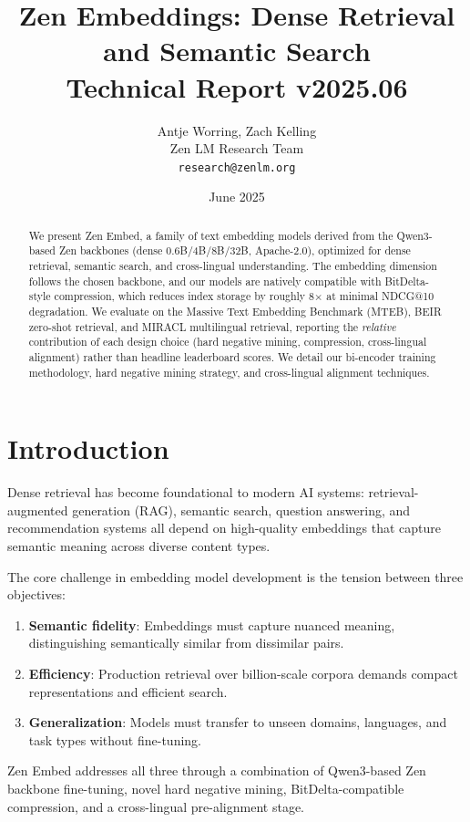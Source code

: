 \documentclass[11pt,a4paper]{article}
\title{\textbf{Zen Embeddings: Dense Retrieval and Semantic Search}\\
\large Technical Report v2025.06}
\author{Antje Worring, Zach Kelling \\ Zen LM Research Team\\
\texttt{research@zenlm.org}}
\date{June 2025}
\begin{document}
\maketitle

\begin{abstract}
We present Zen Embed, a family of text embedding models derived from the Qwen3-based Zen backbones (dense 0.6B/4B/8B/32B, Apache-2.0), optimized for dense retrieval, semantic search, and cross-lingual understanding. The embedding dimension follows the chosen backbone, and our models are natively compatible with BitDelta-style compression, which reduces index storage by roughly 8$\times$ at minimal NDCG@10 degradation. We evaluate on the Massive Text Embedding Benchmark (MTEB), BEIR zero-shot retrieval, and MIRACL multilingual retrieval, reporting the \emph{relative} contribution of each design choice (hard negative mining, compression, cross-lingual alignment) rather than headline leaderboard scores. We detail our bi-encoder training methodology, hard negative mining strategy, and cross-lingual alignment techniques.
\end{abstract}

\section{Introduction}

Dense retrieval has become foundational to modern AI systems: retrieval-augmented generation (RAG), semantic search, question answering, and recommendation systems all depend on high-quality embeddings that capture semantic meaning across diverse content types.

The core challenge in embedding model development is the tension between three objectives:
\begin{enumerate}
  \item \textbf{Semantic fidelity}: Embeddings must capture nuanced meaning, distinguishing semantically similar from dissimilar pairs.
  \item \textbf{Efficiency}: Production retrieval over billion-scale corpora demands compact representations and efficient search.
  \item \textbf{Generalization}: Models must transfer to unseen domains, languages, and task types without fine-tuning.
\end{enumerate}

Zen Embed addresses all three through a combination of Qwen3-based Zen backbone fine-tuning, novel hard negative mining, BitDelta-compatible compression, and a cross-lingual pre-alignment stage.
\end{document}
